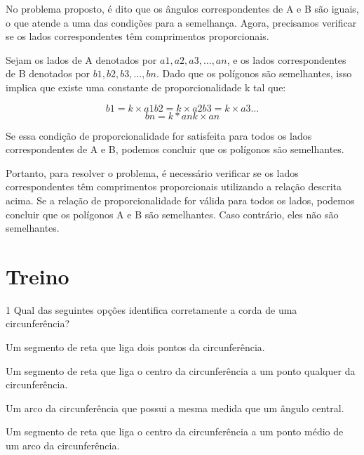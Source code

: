 No problema proposto, é dito que os ângulos correspondentes de A e B são
iguais, o que atende a uma das condições para a semelhança. Agora,
precisamos verificar se os lados correspondentes têm comprimentos
proporcionais.

Sejam os lados de A denotados por $a1, a2, a3, \ldots, an$, e os lados
correspondentes de B denotados por $b1, b2, b3, \ldots, bn$. Dado que os
polígonos são semelhantes, isso implica que existe uma constante de
proporcionalidade k tal que:

$$b1 = k \times a1 b2 = k \times a2 b3 = k \times a3 \ldots{}$$
$$bn = k * an k \times an$$

Se essa condição de proporcionalidade for satisfeita para todos os lados
correspondentes de A e B, podemos concluir que os polígonos são
semelhantes.

Portanto, para resolver o problema, é necessário verificar se os lados
correspondentes têm comprimentos proporcionais utilizando a relação
descrita acima. Se a relação de proporcionalidade for válida para todos
os lados, podemos concluir que os polígonos A e B são semelhantes. Caso
contrário, eles não são semelhantes.

\section*{Treino}

\num{1} Qual das seguintes opções identifica corretamente a corda de uma
circunferência?

\begin{escolha}[itemsep=0pt]
\item Um segmento de reta que liga dois pontos da circunferência.
\item Um segmento de reta que liga o centro da circunferência a um ponto
qualquer da circunferência.
\item Um arco da circunferência que possui a mesma medida que um ângulo
central.
\item Um segmento de reta que liga o centro da circunferência a um ponto
médio de um arco da circunferência.
\end{escolha}


